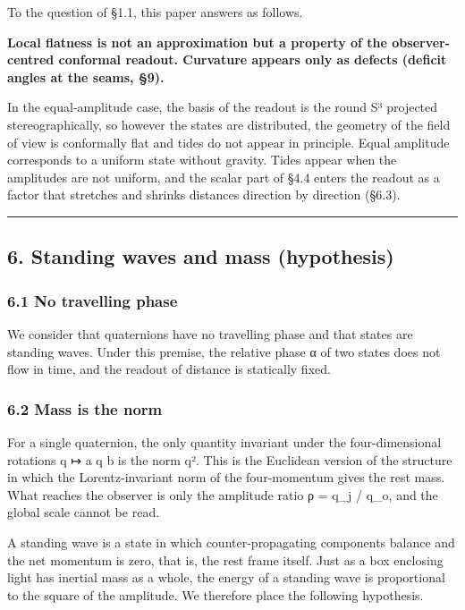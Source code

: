 \documentclass[
  a4paper,
]{article}
\begin{document}
To the question of §1.1, this paper answers as follows.

\textbf{Local flatness is not an approximation but a property of the
observer-centred conformal readout. Curvature appears only as defects
(deficit angles at the seams, §9).}

In the equal-amplitude case, the basis of the readout is the round S³
projected stereographically, so however the states are distributed, the
geometry of the field of view is conformally flat and tides do not
appear in principle. Equal amplitude corresponds to a uniform state
without gravity. Tides appear when the amplitudes are not uniform, and
the scalar part of §4.4 enters the readout as a factor that stretches
and shrinks distances direction by direction (§6.3).

\begin{center}\rule{0.5\linewidth}{0.5pt}\end{center}

\subsection{6. Standing waves and mass
(hypothesis)}\label{standing-waves-and-mass-hypothesis}

\subsubsection{6.1 No travelling phase}\label{no-travelling-phase}

We consider that quaternions have no travelling phase and that states
are standing waves. Under this premise, the relative phase α of two
states does not flow in time, and the readout of distance is statically
fixed.

\subsubsection{6.2 Mass is the norm}\label{mass-is-the-norm}

For a single quaternion, the only quantity invariant under the
four-dimensional rotations q ↦ a q b is the norm \textbar q\textbar².
This is the Euclidean version of the structure in which the
Lorentz-invariant norm of the four-momentum gives the rest mass. What
reaches the observer is only the amplitude ratio ρ =
\textbar q\_j\textbar{} / \textbar q\_o\textbar, and the global scale
cannot be read.

A standing wave is a state in which counter-propagating components
balance and the net momentum is zero, that is, the rest frame itself.
Just as a box enclosing light has inertial mass as a whole, the energy
of a standing wave is proportional to the square of the amplitude. We
therefore place the following hypothesis.
\end{document}
